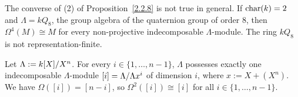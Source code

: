 
\begin{remark}
  The converse of (2) of Proposition~\ref{2.2.8} is not true in general. If $\operatorname{char}(k)=2$ and
  $\Lambda=kQ_8$, the group algebra of the quaternion group of order 8, then $\Omega^4(M) \cong 
  M$ for every non-projective indecomposable $\Lambda$-module. 
  The ring   $kQ_8$ is not representation-finite.
\end{remark}


\begin{example}
Let $\Lambda := k[X]/X^n$. For every $i \in \{1,\ldots,n-1\}$, $\Lambda$ possesses
 exactly one indecomposable $\Lambda$-module $[i] = \Lambda/\Lambda x^i$  of dimension $i$, where
 $x := X + (X^n)$. We have $\Omega([i]) = [n-i]$, so $\Omega^2([i]) \cong  [i]$ for all $i \in \{1,\ldots,n-1\}$.
\end{example}
